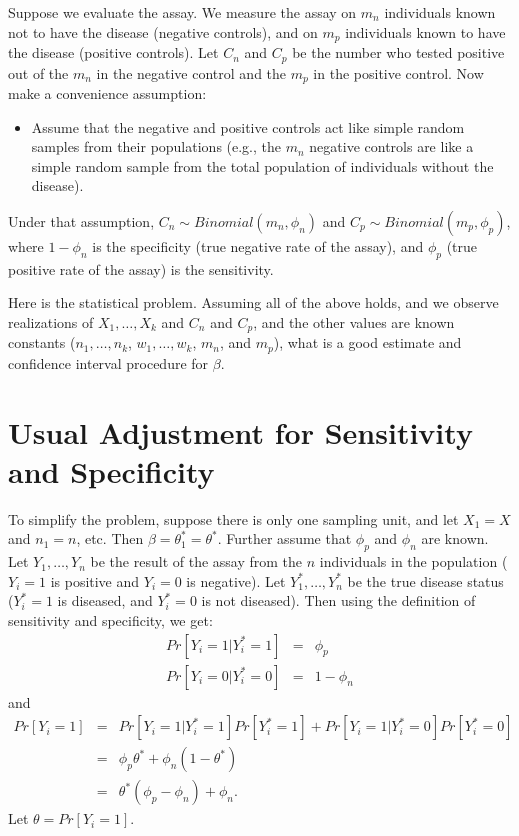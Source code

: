 \documentclass{article}
\begin{document}
Suppose we evaluate the assay. We measure the assay on $m_n$ individuals known not to have the disease (negative controls), and on $m_p$ individuals known to have the disease (positive controls). Let $C_n$ and $C_p$ be the number who tested positive out of the $m_n$ in the negative control and the $m_p$  in the positive control. Now make a convenience assumption:
\begin{itemize}
\item Assume that the negative and positive controls act like simple random samples from their populations (e.g., the $m_n$ negative controls are like a simple random sample from the total population of individuals without the disease).
\end{itemize}
Under that assumption, $C_n \sim Binomial(m_n, \phi_n)$ and $C_p \sim Binomial(m_p, \phi_p)$,
where $1-\phi_n$ is the specificity (true negative rate of the assay),
and $\phi_p$ (true positive rate of the assay) is the sensitivity.

Here is the statistical problem. Assuming all of the above holds, and we observe realizations of $X_1,\ldots, X_k$ and $C_n$ and $C_p$, and the other values are known constants ($n_1,\ldots, n_k$, $w_1,\ldots, w_k$,  $m_n$, and $m_p$), what is a good estimate and confidence interval procedure for $\beta$.


\section{Usual Adjustment for Sensitivity and Specificity}
\label{sec-usualAdj}

To simplify the problem, suppose there is only one sampling unit, and let $X_1=X$ and $n_1=n$, etc. Then $\beta = \theta_1^*=\theta^*$. 
Further assume that $\phi_p$ and $\phi_n$ are known. Let $Y_1,\ldots,Y_n$ be the result of the assay from the $n$ individuals in the population
($Y_i=1$ is positive and $Y_i=0$ is negative). Let $Y_1^*,\ldots,Y_n^*$ be the true disease status ($Y_i^*=1$ is diseased, and $Y_i^*=0$ is not diseased).  
Then using the definition of sensitivity and specificity, we get:
\begin{eqnarray*}
Pr[ Y_i =1 | Y_i^*=1] & = & \phi_p \\
Pr[ Y_i=0 | Y_i^*=0] & = & 1- \phi_n 
\end{eqnarray*}
and 
\begin{eqnarray*}
Pr[ Y_i=1] & = & Pr[ Y_i =1 | Y_i^*=1]  Pr[Y_i^*=1] + Pr[ Y_i =1 | Y_i^*=0] Pr[ Y_i^*=0] \\
& = & \phi_p \theta^* + \phi_n (1-\theta^*)  \\
& = & \theta^* (\phi_p - \phi_n) + \phi_n.
\end{eqnarray*}
Let $\theta = Pr[ Y_i=1]$.
\end{document}
